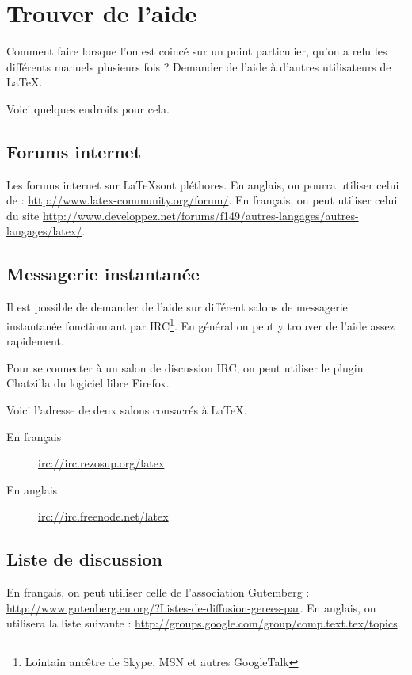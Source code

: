 \chapter{Trouver de l'aide}

\begin{prealable}
Comment faire lorsque l'on est coincé sur un point particulier, qu'on a relu les différents manuels plusieurs fois ? Demander de l'aide à d'autres utilisateurs de \LaTeX{}.

Voici quelques endroits pour cela. 
\end{prealable}

\section{Forums internet}

Les forums internet sur \LaTeX sont pléthores. En anglais, on pourra utiliser celui de  : \url{http://www.latex-community.org/forum/}. En français, on peut utiliser celui du site  \url{http://www.developpez.net/forums/f149/autres-langages/autres-langages/latex/}.


\section{Messagerie instantanée}

Il est possible de demander de l'aide sur différent salons de messagerie instantanée fonctionnant par IRC\footnote{Lointain ancêtre de Skype, MSN et autres GoogleTalk}. En général on peut y trouver de l'aide assez rapidement.

Pour se connecter à un salon de discussion IRC, on peut utiliser le plugin Chatzilla du logiciel libre Firefox.

Voici l'adresse de deux salons consacrés à \LaTeX.

\begin{description}
\item[En français]\url{irc://irc.rezosup.org/latex}
\item[En anglais]\url{irc://irc.freenode.net/latex}
\end{description}

\section{Liste de discussion}

En français, on peut utiliser celle de l'association Gutemberg : \url{http://www.gutenberg.eu.org/?Listes-de-diffusion-gerees-par}. En anglais, on utilisera la liste suivante : \url{http://groups.google.com/group/comp.text.tex/topics}.
